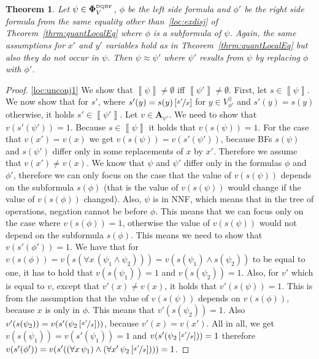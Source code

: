 \documentclass[
  digital, %
  color,
  twoside, %
  table,   %
  nolof,     %
  nolot,     %
]{fithesis3}
\newtheorem{theorem}{Theorem}[chapter] %
\theoremstyle{definition}
\theoremstyle{remark}
\newcommand{\seman}[1]{\left\llbracket {#1} \right\rrbracket}
\newcommand{\substitute}[2]{\left[ \nicefrac{#2}{#1} \right]}
\newcommand{\DQBF}[1]{\mathbf{\Phi}_{#1}^{\normalfont{\text{\tiny DQBF}}}}
\newcommand{\valtns}[1]{\mathbf{A}_{#1}}
\newcommand{\evars}[1]{V_{#1}^{\exists}}
\newcommand{\itholds}{\,}
\begin{document}
\begin{theorem}
  \label{thrm:quantLocalSubformulas}
  Let $\psi \in \DQBF{V}$, $\phi$ be the left side formula and $\phi'$ be the right side formula  from the same equality other than~\eqref{loc:exdisj} of Theorem~\ref{thrm:quantLocalEq} where $\phi$ is a subformula of $\psi$. Again, the same assumptions for $x'$ and $y'$ variables hold as in Theorem~\ref{thrm:quantLocalEq} but also they do not occur in $\psi$. Then $\psi \approx \psi'$ where $\psi'$ results from $\psi$ by replacing $\phi$ with $\phi'$.
\end{theorem}
\begin{proof}
  \eqref{loc:unconj1} We show that $\seman{\psi} \not= \emptyset$ iff $\seman{\psi'} \not= \emptyset$. First, let $s \in \seman{\psi}$. We now show that for $s'$, where $s'(y) = s(y)\substitute{x}{x'}$ for $y \in \evars{\phi'}$ and $s'(y) = s(y)$ otherwise, it holds $s' \in \seman{\psi'}$. Let $v \in \valtns{\psi'}$. We need to show that $v(s'(\psi')) = 1$. Because $s \in \seman{\psi}$ it holds that $v(s(\psi)) = 1$. For the case that $v(x') = v(x)$ we get $v(s(\psi)) = v(s'(\psi'))$, because BFs $s(\psi)$ and $s(\psi')$ differ only in some replacements of $x$ by $x'$. Therefore we assume that $v(x') \not= v(x)$. We know that $\psi$ and $\psi'$ differ only in the formulas $\phi$ and $\phi'$, therefore we can only focus on the case that the value of $v(s(\psi))$ depends on the subformula $s(\phi)$ (that is the value of $v(s(\psi))$ would change if the value of $v(s(\phi))$ changed). Also, $\psi$ is in NNF, which means that in the tree of operations, negation cannot be before $\phi$. This means that we can focus only on the case where $v(s(\phi)) = 1$, otherwise the value of $v(s(\psi))$ would not depend on the subformula $s(\phi)$. This means we need to show that $v(s'(\phi')) = 1$. We have that for $v(s(\phi)) = v(s(\forall x \itholds (\psi_1 \land \psi_2))) = v(s(\psi_1) \land s(\psi_2))$ to be equal to one, it has to hold that $v(s(\psi_1)) = 1$ and $v(s(\psi_2)) = 1$. Also, for $v'$ which is equal to $v$, except that $v'(x) \not= v(x)$, it holds that $v'(s(\psi)) = 1$. This is from the assumption that the value of $v(s(\psi))$ depends on $v(s(\phi))$, because $x$ is only in $\phi$. This means that $v'(s(\psi_2)) = 1$. Also $v'(s(\psi_2)) = v(s'(\psi_2\substitute{x}{x'}))$, because $v'(x) = v(x')$. All in all, we get $v(s(\psi_1)) = v(s'(\psi_1)) = 1$ and $v(s'(\psi_2\substitute{x}{x'})) = 1$ therefore $v(s'(\phi')) = v(s'((\forall x \itholds \psi_1) \land (\forall x' \itholds \psi_2\substitute{x}{x'}))) = 1$.
  

\end{proof}
\end{document}
